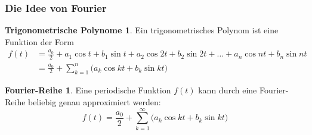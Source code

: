 %
%
%
\theoremstyle{definition}
\newtheorem{trigopol}{Trigonometrische Polynome}
\newtheorem{fourier}{Fourier-Reihe}
\newtheorem{leastsquares}{Kleinste Quadrate}
\newtheorem{loesung}{Lösung}
\newtheorem{geometrie}{Schwerpunkt}
\newtheorem{produkte}{Produkte}



\setlength{\abovedisplayskip}{3pt}
\setlength{\belowdisplayskip}{3pt}


%
%
\begin{frame}
\frametitle{Die Idee von Fourier}
\begin{trigopol}
Ein trigonometrisches Polynom ist eine Funktion der Form
\begin{align*}
f(t)
&=
\frac{a_0}2 + a_1\cos t+b_1\sin t + a_2\cos 2t + b_2\sin 2t + \dots + a_n\cos nt+b_n\sin nt
\\
&=
\frac{a_0}2 + \sum_{k=1}^n \bigl( a_k \cos kt + b_k\sin kt\bigr)
\end{align*}
\end{trigopol}
\begin{fourier}
Eine periodische Funktion $f(t)$ kann durch eine Fourier-Reihe beliebig
genau approximiert werden:
\[
f(t)
=
\frac{a_0}2 + \sum_{k=1}^{\infty} \bigl( a_k \cos kt + b_k\sin kt\bigr)
\]
\end{fourier}
\end{frame}

